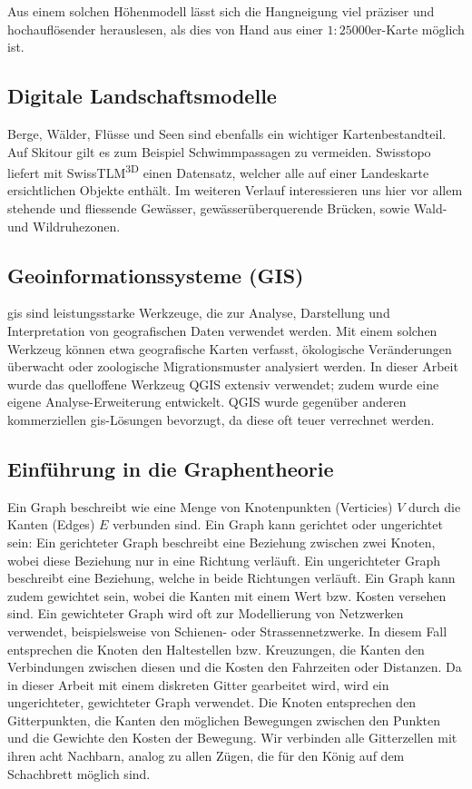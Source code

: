 Aus einem solchen Höhenmodell lässt sich die Hangneigung viel präziser und hochauflösender herauslesen, als dies von Hand aus einer $1:25000$er-Karte möglich ist.

\subsection{Digitale Landschaftsmodelle}

Berge, Wälder, Flüsse und Seen sind ebenfalls ein wichtiger Kartenbestandteil. Auf Skitour gilt es zum Beispiel Schwimmpassagen zu vermeiden. Swisstopo liefert mit SwissTLM\textsuperscript{3D} einen Datensatz, welcher alle auf einer Landeskarte ersichtlichen Objekte enthält. Im weiteren Verlauf interessieren uns hier vor allem stehende und fliessende Gewässer, gewässerüberquerende Brücken, sowie Wald- und Wildruhezonen.

\subsection{Geoinformationssysteme (GIS)}\label{sec:gis}

\acrshort{gis} sind leistungsstarke Werkzeuge, die zur Analyse, Darstellung und Interpretation von geografischen Daten verwendet werden. Mit einem solchen Werkzeug können etwa geografische Karten verfasst, ökologische Veränderungen überwacht oder zoologische Migrationsmuster analysiert werden.
In dieser Arbeit wurde das quelloffene Werkzeug QGIS extensiv verwendet; zudem wurde eine eigene Analyse-Erweiterung entwickelt. QGIS wurde gegenüber anderen kommerziellen \acrshort{gis}-Lösungen bevorzugt, da diese oft teuer verrechnet werden.~\cite{qgis}

\subsection{Einführung in die Graphentheorie}

Ein Graph beschreibt wie eine Menge von Knotenpunkten (Verticies) $V$ durch die Kanten (Edges) $E$ verbunden sind. Ein Graph kann gerichtet oder ungerichtet sein: Ein gerichteter Graph beschreibt eine Beziehung zwischen zwei Knoten, wobei diese Beziehung nur in eine Richtung verläuft. Ein ungerichteter Graph beschreibt eine Beziehung, welche in beide Richtungen verläuft. Ein Graph kann zudem gewichtet sein, wobei die Kanten mit einem Wert bzw. Kosten versehen sind. Ein gewichteter Graph wird oft zur Modellierung von Netzwerken verwendet, beispielsweise von Schienen- oder Strassennetzwerke. In diesem Fall entsprechen die Knoten den Haltestellen bzw. Kreuzungen, die Kanten den Verbindungen zwischen diesen und die Kosten den Fahrzeiten oder Distanzen.
Da in dieser Arbeit mit einem diskreten Gitter gearbeitet wird, wird ein ungerichteter, gewichteter Graph verwendet. Die Knoten entsprechen den Gitterpunkten, die Kanten den möglichen Bewegungen zwischen den Punkten und die Gewichte den Kosten der Bewegung. Wir verbinden alle Gitterzellen mit ihren acht Nachbarn, analog zu allen Zügen, die für den König auf dem Schachbrett möglich sind.


